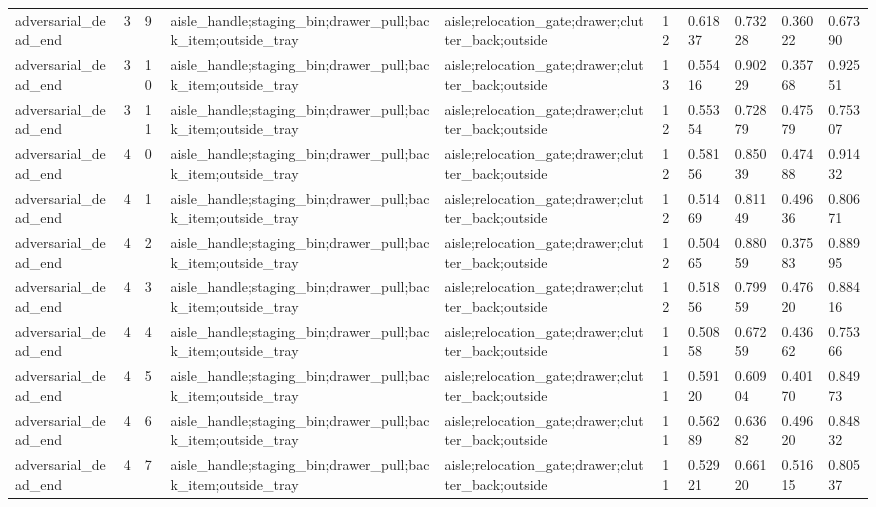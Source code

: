 \documentclass{article}
\begin{document}
\begin{table}[tbp]
{\begin{tabular}{llllllllll}
adversarial\_dead\_end & 3 & 9 & aisle\_handle;staging\_bin;drawer\_pull;back\_item;outside\_tray & aisle;relocation\_gate;drawer;clutter\_back;outside & 12 & 0.61837 & 0.73228 & 0.36022 & 0.67390 \\
adversarial\_dead\_end & 3 & 10 & aisle\_handle;staging\_bin;drawer\_pull;back\_item;outside\_tray & aisle;relocation\_gate;drawer;clutter\_back;outside & 13 & 0.55416 & 0.90229 & 0.35768 & 0.92551 \\
adversarial\_dead\_end & 3 & 11 & aisle\_handle;staging\_bin;drawer\_pull;back\_item;outside\_tray & aisle;relocation\_gate;drawer;clutter\_back;outside & 12 & 0.55354 & 0.72879 & 0.47579 & 0.75307 \\
adversarial\_dead\_end & 4 & 0 & aisle\_handle;staging\_bin;drawer\_pull;back\_item;outside\_tray & aisle;relocation\_gate;drawer;clutter\_back;outside & 12 & 0.58156 & 0.85039 & 0.47488 & 0.91432 \\
adversarial\_dead\_end & 4 & 1 & aisle\_handle;staging\_bin;drawer\_pull;back\_item;outside\_tray & aisle;relocation\_gate;drawer;clutter\_back;outside & 12 & 0.51469 & 0.81149 & 0.49636 & 0.80671 \\
adversarial\_dead\_end & 4 & 2 & aisle\_handle;staging\_bin;drawer\_pull;back\_item;outside\_tray & aisle;relocation\_gate;drawer;clutter\_back;outside & 12 & 0.50465 & 0.88059 & 0.37583 & 0.88995 \\
adversarial\_dead\_end & 4 & 3 & aisle\_handle;staging\_bin;drawer\_pull;back\_item;outside\_tray & aisle;relocation\_gate;drawer;clutter\_back;outside & 12 & 0.51856 & 0.79959 & 0.47620 & 0.88416 \\
adversarial\_dead\_end & 4 & 4 & aisle\_handle;staging\_bin;drawer\_pull;back\_item;outside\_tray & aisle;relocation\_gate;drawer;clutter\_back;outside & 11 & 0.50858 & 0.67259 & 0.43662 & 0.75366 \\
adversarial\_dead\_end & 4 & 5 & aisle\_handle;staging\_bin;drawer\_pull;back\_item;outside\_tray & aisle;relocation\_gate;drawer;clutter\_back;outside & 11 & 0.59120 & 0.60904 & 0.40170 & 0.84973 \\
adversarial\_dead\_end & 4 & 6 & aisle\_handle;staging\_bin;drawer\_pull;back\_item;outside\_tray & aisle;relocation\_gate;drawer;clutter\_back;outside & 11 & 0.56289 & 0.63682 & 0.49620 & 0.84832 \\
adversarial\_dead\_end & 4 & 7 & aisle\_handle;staging\_bin;drawer\_pull;back\_item;outside\_tray & aisle;relocation\_gate;drawer;clutter\_back;outside & 11 & 0.52921 & 0.66120 & 0.51615 & 0.80537 \\

\end{tabular}}
\end{table}
\end{document}
